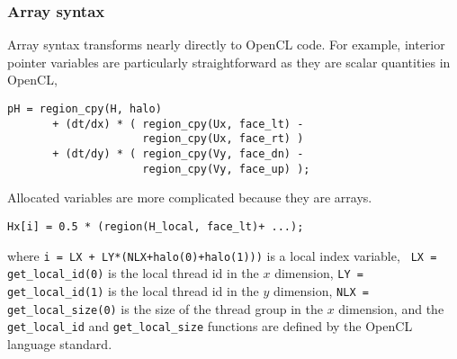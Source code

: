 \subsubsection{Array syntax}

Array syntax transforms nearly directly to OpenCL code.  For example, interior
pointer variables are particularly straightforward as they are scalar quantities in
OpenCL,
{\small
\begin{verbatim}
pH = region_cpy(H, halo)
       + (dt/dx) * ( region_cpy(Ux, face_lt) -
                     region_cpy(Ux, face_rt) )
       + (dt/dy) * ( region_cpy(Vy, face_dn) -
                     region_cpy(Vy, face_up) );
\end{verbatim}
}
\noindent
Allocated variables are more complicated because they are arrays.
{\small
\begin{verbatim}
Hx[i] = 0.5 * (region(H_local, face_lt)+ ...);
\end{verbatim}
}
\noindent
where {\tt i = LX + LY*(NLX+halo(0)+halo(1)))} is a local index variable, {\tt
  LX = get\_local\_id(0)} is the local thread id in the $x$ dimension, {\tt LY =
  get\_local\_id(1)} is the local thread id in the $y$ dimension, {\tt NLX =
  get\_local\_size(0)} is the size of the thread group in the $x$ dimension, and
the {\tt get\_local\_id} and {\tt get\_local\_size} functions are defined by the
OpenCL language standard.



